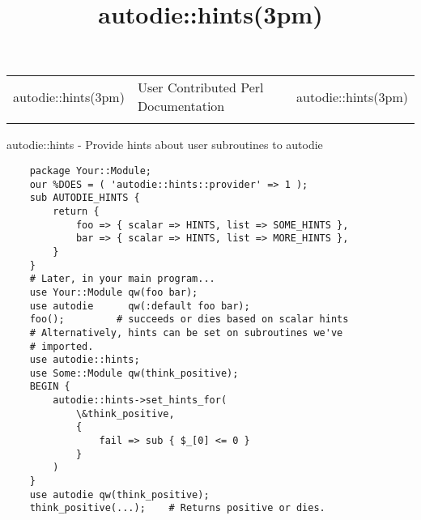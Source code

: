 \documentclass[]{article}
\title{autodie::hints(3pm)}
\author{}
\date{}
\begin{document}
\maketitle

\begin{longtable}[c]{@{}lll@{}}
\toprule\addlinespace
autodie::hints(3pm) & User Contributed Perl Documentation &
autodie::hints(3pm)
\\\addlinespace
\bottomrule
\end{longtable}


autodie::hints - Provide hints about user subroutines to autodie


\begin{verbatim}
    package Your::Module;
    our %DOES = ( 'autodie::hints::provider' => 1 );
    sub AUTODIE_HINTS {
        return {
            foo => { scalar => HINTS, list => SOME_HINTS },
            bar => { scalar => HINTS, list => MORE_HINTS },
        }
    }
    # Later, in your main program...
    use Your::Module qw(foo bar);
    use autodie      qw(:default foo bar);
    foo();         # succeeds or dies based on scalar hints
    # Alternatively, hints can be set on subroutines we've
    # imported.
    use autodie::hints;
    use Some::Module qw(think_positive);
    BEGIN {
        autodie::hints->set_hints_for(
            \&think_positive,
            {
                fail => sub { $_[0] <= 0 }
            }
        )
    }
    use autodie qw(think_positive);
    think_positive(...);    # Returns positive or dies.
\end{verbatim}


\end{document}
